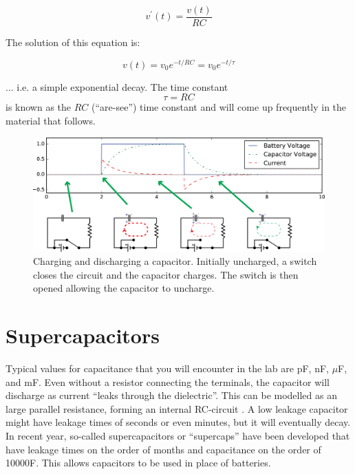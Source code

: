 \documentclass{tufte-book}
\begin{document}
$$
v^\prime(t) =\frac{v(t)}{RC}
$$

\noindent The solution of this equation is:

\begin{equation}\label{eq:discharge}
v(t) = v_0e^{-t/RC} = v_0e^{-t/\tau}
\end{equation}

\noindent ... i.e. a simple exponential decay. The time constant 
\begin{equation}\label{eq:rctimeconst}
\tau = RC
\end{equation}
\noindent is known as the $RC$ (``are-see'')  time constant and will come up frequently in the material that follows.

\begin{figure}[h]
\caption{Charging and discharging a capacitor. Initially uncharged, a switch closes the circuit and the capacitor charges. The switch is then opened allowing the capacitor to uncharge.}
\label{fig:chargedischarge}
\begin{center}
\includegraphics[width=\textwidth]{chargedischarge.png}
\end{center}
\end{figure}

\section{Supercapacitors}
Typical values for capacitance that you will encounter in the lab are pF, nF, $\mu$F, and mF. Even without a resistor connecting the terminals, the capacitor will discharge as current ``leaks through the dielectric''. This can be modelled as an large parallel resistance, forming an internal RC-circuit . A low leakage capacitor might have leakage times of seconds or even minutes, but it will eventually decay. In recent year, so-called supercapacitors or ``supercaps'' have been developed that have leakage times on the order of months and capacitance on the order of 10000F. This allows capacitors to be used in place of batteries.
\end{document}
